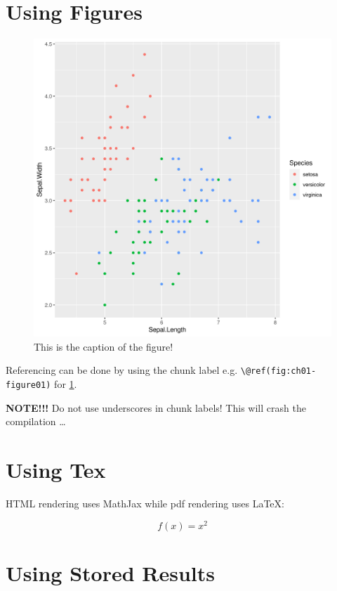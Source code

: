 \documentclass[]{krantz}
\begin{document}
\citet{rlang}

\section{Using Figures}\label{using-figures}

\begin{figure}

{\centering \includegraphics[width=0.8\linewidth]{figures/010-test/ch01-figure01} 

}

\caption{This is the caption of the figure!}\label{fig:ch01-figure01}
\end{figure}



Referencing can be done by using the chunk label e.g.
\texttt{\textbackslash{}@ref(fig:ch01-figure01)} for
\ref{fig:ch01-figure01}.

\textbf{NOTE!!!} Do not use underscores in chunk labels! This will crash
the compilation \ldots{}

\section{Using Tex}\label{using-tex}

HTML rendering uses MathJax while pdf rendering uses LaTeX:

\[
f(x) = x^2
\]

\section{Using Stored Results}\label{using-stored-results}
\end{document}
